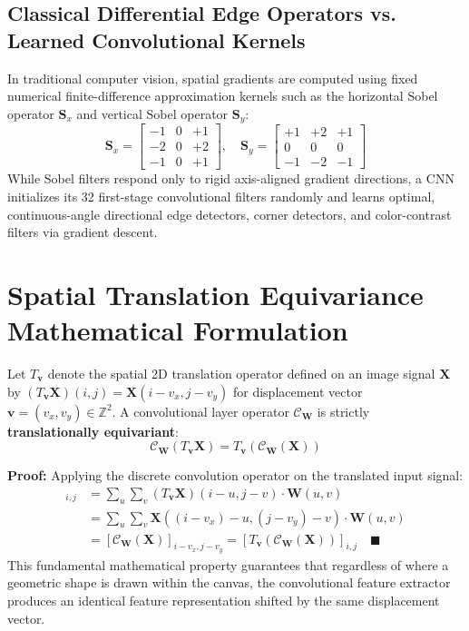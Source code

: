 \documentclass[11pt,a4paper,oneside]{report}
\begin{document}
\subsection{Classical Differential Edge Operators vs. Learned Convolutional Kernels}
In traditional computer vision, spatial gradients are computed using fixed numerical finite-difference approximation kernels such as the horizontal Sobel operator $\mathbf{S}_x$ and vertical Sobel operator $\mathbf{S}_y$:
\begin{equation}
    \mathbf{S}_x = \begin{bmatrix} -1 & 0 & +1 \\ -2 & 0 & +2 \\ -1 & 0 & +1 \end{bmatrix}, \quad \mathbf{S}_y = \begin{bmatrix} +1 & +2 & +1 \\ 0 & 0 & 0 \\ -1 & -2 & -1 \end{bmatrix}
\end{equation}
While Sobel filters respond only to rigid axis-aligned gradient directions, a CNN initializes its 32 first-stage convolutional filters randomly and learns optimal, continuous-angle directional edge detectors, corner detectors, and color-contrast filters via gradient descent.

\section{Spatial Translation Equivariance Mathematical Formulation}
Let $T_{\mathbf{v}}$ denote the spatial 2D translation operator defined on an image signal $\mathbf{X}$ by $(T_{\mathbf{v}} \mathbf{X})(i, j) = \mathbf{X}(i - v_x, j - v_y)$ for displacement vector $\mathbf{v} = (v_x, v_y) \in \mathbb{Z}^2$. 
A convolutional layer operator $\mathcal{C}_{\mathbf{W}}$ is strictly \textbf{translationally equivariant}:
\begin{equation}
    \mathcal{C}_{\mathbf{W}}(T_{\mathbf{v}} \mathbf{X}) = T_{\mathbf{v}}(\mathcal{C}_{\mathbf{W}}(\mathbf{X}))
\end{equation}

\textbf{Proof:}
Applying the discrete convolution operator on the translated input signal:
\begin{align}
    [\mathcal{C}_{\mathbf{W}}(T_{\mathbf{v}} \mathbf{X})]_{i, j} &= \sum_{u} \sum_{v} (T_{\mathbf{v}} \mathbf{X})(i - u, j - v) \cdot \mathbf{W}(u, v) \\
    &= \sum_{u} \sum_{v} \mathbf{X}((i - v_x) - u, (j - v_y) - v) \cdot \mathbf{W}(u, v) \\
    &= [\mathcal{C}_{\mathbf{W}}(\mathbf{X})]_{i - v_x, j - v_y} = [T_{\mathbf{v}}(\mathcal{C}_{\mathbf{W}}(\mathbf{X}))]_{i, j} \quad \blacksquare
\end{align}
This fundamental mathematical property guarantees that regardless of where a geometric shape is drawn within the canvas, the convolutional feature extractor produces an identical feature representation shifted by the same displacement vector.
\end{document}

